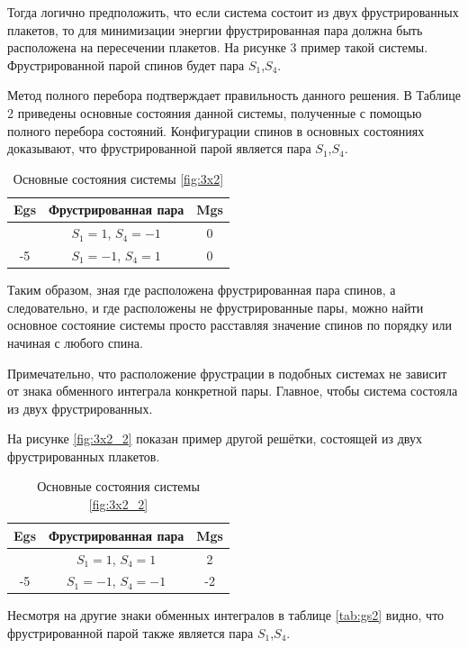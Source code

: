 \documentclass[utf8, babel, sor, jor, amsmath, amssymb, reprint]{elsarticle} %
\begin{document}
Тогда логично предположить, что если система состоит из двух фрустрированных плакетов, то для минимизации энергии фрустрированная пара должна быть расположена на пересечении плакетов. На рисунке 3 пример такой системы. Фрустрированной парой спинов будет пара $S_1$,$S_4$.

Метод полного перебора подтверждает правильность данного решения. В Таблице 2 приведены основные состояния данной системы, полученные с помощью полного перебора состояний. Конфигурации спинов в основных состояниях доказывают, что фрустрированной парой является пара $S_1$,$S_4$. 

\begin{table}[h]
	\centering
	\begin{tabular}{|c|c|c|}
		\hline
		 Egs   &   Фрустрированная пара & Mgs\\
		 \hline
		  &  $S_1=1$, $S_4=-1$ & 0 \\
		  \cline{2-3}
		  	-5	\multirow{3}{*}{}
		   &   $S_1=-1$, $S_4=1$ & 0 \\
		\hline
	\end{tabular}
	\caption{Основные состояния системы \eqref{fig:3x2} }
	\label{tab:gs}
\end{table}

Таким образом, зная где расположена фрустрированная пара спинов, а следовательно, и где расположены не фрустрированные пары, можно найти основное состояние системы просто расставляя значение спинов по порядку или начиная с любого спина. 

Примечательно, что расположение фрустрации в подобных системах не зависит от знака обменного интеграла конкретной пары. Главное, чтобы система состояла из двух фрустрированных.


На рисунке \eqref{fig:3x2_2} показан пример другой решётки, состоящей из двух фрустрированных плакетов.

\begin{table}[h]
	\centering
	\begin{tabular}{|c|c|c|}
		\hline
		Egs   &   Фрустрированная пара & Mgs \\
		\hline
		   &  $S_1=1$, $S_4=1$ & 2 \\
		\cline{2-3}
		-5	\multirow{3}{*}{}
		 &   $S_1=-1$, $S_4=-1$ & -2 \\
		\hline
	\end{tabular}
	\caption{Основные состояния системы \eqref{fig:3x2_2}}
	\label{tab:gs2}
\end{table}

Несмотря на другие знаки обменных интегралов в таблице \eqref{tab:gs2} видно, что фрустрированной парой также является пара $S_1$,$S_4$.
\end{document}
